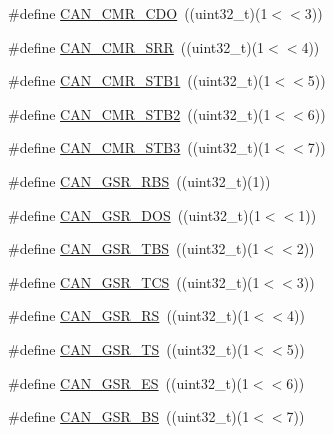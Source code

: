 \begin{DoxyCompactItemize}
\item 
\#define \hyperlink{group___c_a_n___private___macros_ga867ee74878ca3d86ec6d0cd2e25e15ac}{\-C\-A\-N\-\_\-\-C\-M\-R\-\_\-\-C\-D\-O}~((uint32\-\_\-t)(1$<$$<$3))
\item 
\#define \hyperlink{group___c_a_n___private___macros_gadf85238951b64fd26cc0efcb0e8508ec}{\-C\-A\-N\-\_\-\-C\-M\-R\-\_\-\-S\-R\-R}~((uint32\-\_\-t)(1$<$$<$4))
\item 
\#define \hyperlink{group___c_a_n___private___macros_gae80bee474faaf1c9b36d910256589531}{\-C\-A\-N\-\_\-\-C\-M\-R\-\_\-\-S\-T\-B1}~((uint32\-\_\-t)(1$<$$<$5))
\item 
\#define \hyperlink{group___c_a_n___private___macros_ga30a4cdbb4aecb78241cf9543665c358f}{\-C\-A\-N\-\_\-\-C\-M\-R\-\_\-\-S\-T\-B2}~((uint32\-\_\-t)(1$<$$<$6))
\item 
\#define \hyperlink{group___c_a_n___private___macros_gaa62c1f2faa73f977f7f8b36156d70dce}{\-C\-A\-N\-\_\-\-C\-M\-R\-\_\-\-S\-T\-B3}~((uint32\-\_\-t)(1$<$$<$7))
\item 
\#define \hyperlink{group___c_a_n___private___macros_gacde523e4e3bdc91292d6fca05f3cf744}{\-C\-A\-N\-\_\-\-G\-S\-R\-\_\-\-R\-B\-S}~((uint32\-\_\-t)(1))
\item 
\#define \hyperlink{group___c_a_n___private___macros_ga2812bef760e324f711bdf9f5ec6080db}{\-C\-A\-N\-\_\-\-G\-S\-R\-\_\-\-D\-O\-S}~((uint32\-\_\-t)(1$<$$<$1))
\item 
\#define \hyperlink{group___c_a_n___private___macros_ga06334090a05005aac523bb3f7273de6f}{\-C\-A\-N\-\_\-\-G\-S\-R\-\_\-\-T\-B\-S}~((uint32\-\_\-t)(1$<$$<$2))
\item 
\#define \hyperlink{group___c_a_n___private___macros_gac8f1a706b4a31638bf92c8cfa6b191a2}{\-C\-A\-N\-\_\-\-G\-S\-R\-\_\-\-T\-C\-S}~((uint32\-\_\-t)(1$<$$<$3))
\item 
\#define \hyperlink{group___c_a_n___private___macros_ga5baf53192002d55ec53fd5c679222d93}{\-C\-A\-N\-\_\-\-G\-S\-R\-\_\-\-R\-S}~((uint32\-\_\-t)(1$<$$<$4))
\item 
\#define \hyperlink{group___c_a_n___private___macros_ga204f003cdb1c178fa4822fd690bd75b8}{\-C\-A\-N\-\_\-\-G\-S\-R\-\_\-\-T\-S}~((uint32\-\_\-t)(1$<$$<$5))
\item 
\#define \hyperlink{group___c_a_n___private___macros_ga2e57210b60bc08effc08aa5362978cdc}{\-C\-A\-N\-\_\-\-G\-S\-R\-\_\-\-E\-S}~((uint32\-\_\-t)(1$<$$<$6))
\item 
\#define \hyperlink{group___c_a_n___private___macros_gaa304ce39b130166e51304ded48d0c969}{\-C\-A\-N\-\_\-\-G\-S\-R\-\_\-\-B\-S}~((uint32\-\_\-t)(1$<$$<$7))

\end{DoxyCompactItemize}
